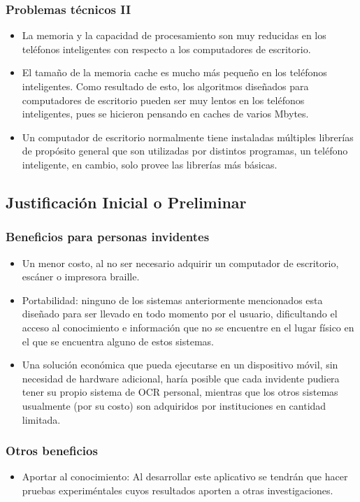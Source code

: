 \documentclass{beamer}
\begin{document}
	\begin{frame}
	\frametitle{Problemas técnicos II}
	\begin{itemize}
		\pause
		\item La memoria y la capacidad de procesamiento son muy reducidas en los teléfonos inteligentes con respecto a los computadores de escritorio.
		\pause
		\item El tamaño de la memoria cache es mucho más pequeño en los teléfonos inteligentes. Como resultado de esto, los algoritmos diseñados para computadores de escritorio pueden ser muy lentos en los teléfonos inteligentes, pues se hicieron pensando en caches de varios Mbytes.
		\pause
		\item Un computador de escritorio normalmente tiene instaladas múltiples librerías de propósito general que son utilizadas por distintos programas, un teléfono inteligente, en cambio, solo provee las librerías más básicas.
	\end{itemize}
	\end{frame}
	
	\subsection{Justificación Inicial o Preliminar}
	\begin{frame}
	\frametitle{Beneficios para personas invidentes}
	\begin{itemize}
	\item Un menor costo, al no ser necesario adquirir un computador de escritorio, escáner o impresora braille.
	\pause
	\item Portabilidad: ninguno de los sistemas anteriormente mencionados esta diseñado para ser llevado en todo momento por el usuario, dificultando el acceso al conocimiento e información que no se encuentre en el lugar físico en el que se encuentra alguno de estos sistemas.
	\pause
	\item Una solución económica que pueda ejecutarse en un dispositivo móvil, sin necesidad de hardware adicional, haría posible que cada invidente pudiera tener su propio sistema de OCR personal, mientras que los otros sistemas usualmente (por su costo) son adquiridos por instituciones en cantidad limitada.

	\end{itemize}
	\end{frame}
	
	\begin{frame}
	\frametitle{Otros beneficios}
	\begin{itemize}
	\item Aportar al conocimiento: Al desarrollar este aplicativo se tendrán que hacer pruebas experiméntales cuyos resultados aporten a otras investigaciones.
	\end{itemize}
	\end{frame}
	
\end{document}
